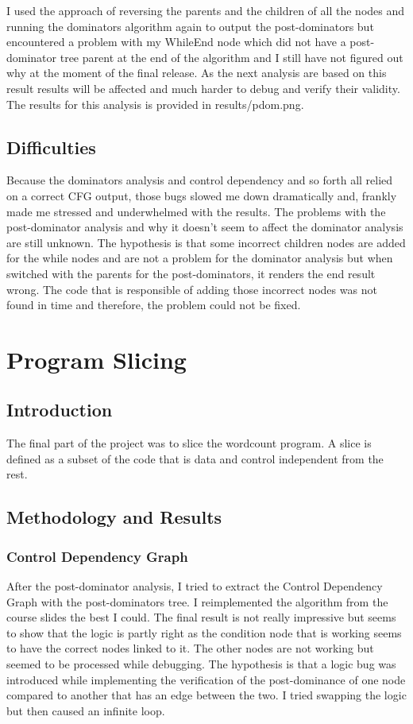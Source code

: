 \documentclass[conference,compsoc]{IEEEtran}
\begin{document}
I used the approach of reversing the parents and the children of all the nodes and running the dominators algorithm again
 to output the post-dominators but encountered a problem with my WhileEnd node which did not have a post-dominator tree parent
at the end of the algorithm and I still have not figured out why at the moment of the final release. As the next analysis are based on this result
 results will be affected and much harder to debug and verify their validity. The results for this analysis is provided in results/pdom.png.

\subsection{Difficulties}

 Because the dominators analysis and control dependency and so forth all relied on a correct CFG output,
 those bugs slowed me down dramatically and, frankly made me stressed and underwhelmed with the results.
 The problems with the post-dominator analysis and why it doesn't seem to affect the dominator analysis are still
 unknown. The hypothesis is that some incorrect children nodes are added for the while nodes and are not a problem
 for the dominator analysis but when switched with the parents for the post-dominators, it renders the end result wrong.
 The code that is responsible of adding those incorrect nodes was not found in time and therefore, the problem could not be fixed.

\section{Program Slicing}

\subsection{Introduction}
The final part of the project was to slice the wordcount program. A slice is defined as a subset of the code that is data and control independent from the rest.

\subsection{Methodology and Results}
\subsubsection{Control Dependency Graph}
After the post-dominator analysis, I tried to extract the Control Dependency Graph with the post-dominators tree.
I reimplemented the algorithm from the course slides the best I could. The final result is not really impressive but seems to show
 that the logic is partly right as the condition node that is working seems to have the correct nodes linked to it. The other nodes
are not working but seemed to be processed while debugging. The hypothesis is that a logic bug was introduced while implementing the
 verification of the post-dominance of one node compared to another that has an edge between the two. I tried swapping the logic but then
 caused an infinite loop.
\end{document}
